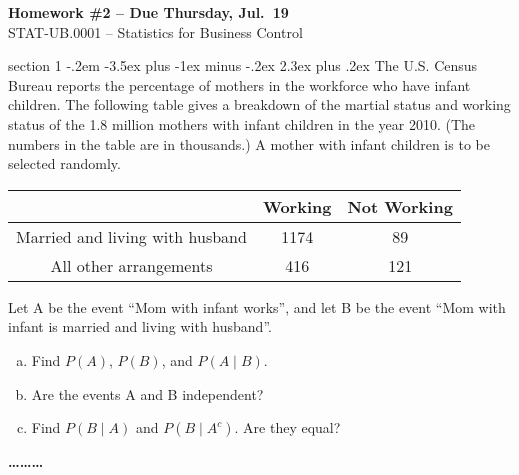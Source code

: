 \documentclass[11pt]{article}
\makeatletter
\newenvironment{problem}{\@startsection
       {section}
       {1}
       {-.2em}
       {-3.5ex plus -1ex minus -.2ex}
       {2.3ex plus .2ex}
       {\pagebreak[3]%
       \large\bf\noindent{Problem }
       }
       }
       {%
       \begin{center}\large\bf \ldots\ldots\ldots\end{center}}
\makeatother
\begin{document}
\begin{center}
  \large
  \textbf{Homework \#2 -- Due Thursday, Jul.~19} \\
  STAT-UB.0001 -- Statistics for Business Control \\
\end{center}


\thispagestyle{empty}



\begin{problem}{}
The U.S. Census Bureau reports the percentage of mothers in the workforce who have infant children.
The following table gives a breakdown of the martial status and working status of the 1.8 million mothers with infant children in the year 2010.
(The numbers in the table are in thousands.) A mother with infant children is to be selected randomly.

\begin{table}[h!]
\begin{center}
\begin{tabular}{|c|c|c|} \hline
 & Working & Not Working \\ \hline
Married and living with husband & 1174 & 89\\ \hline
All other arrangements & 416 & 121  \\ \hline
\end{tabular}
\end{center}
\end{table}

Let A be the event ``Mom with infant works'', and let B be the event ``Mom with infant is married and living with husband''.
\begin{enumerate}[(a)]
\item Find $P(A)$, $P(B)$, and $P(A\mid B)$.
\item Are the events A and B independent?
\item Find $P(B\mid A)$ and $P(B \mid A^c)$. Are they equal?
\end{enumerate}
\end{problem}
\end{document}
